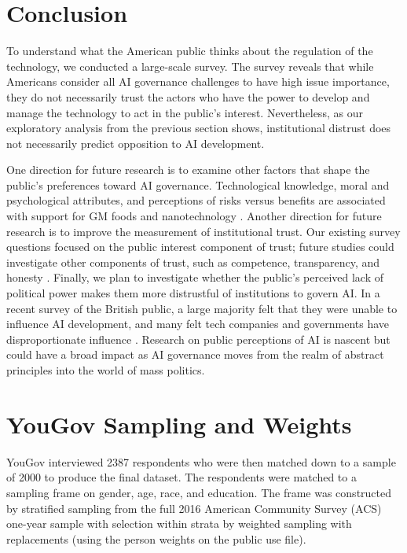 \documentclass{article}
\begin{document}
\section{Conclusion}

To understand what the American public thinks about the regulation of the technology, we conducted a large-scale survey. The survey reveals that while Americans consider all AI governance challenges to have high issue importance, they do not necessarily trust the actors who have the power to develop and manage the technology to act in the public's interest. Nevertheless, as our exploratory analysis from the previous section shows, institutional distrust does not necessarily predict opposition to AI development. 

One direction for future research is to examine other factors that shape the public's preferences toward AI governance. Technological knowledge, moral and psychological attributes, and perceptions of risks versus benefits are associated with support for GM foods and nanotechnology \citep{scott2018overview,satterfield2009anticipating}. Another direction for future research is to improve the measurement of institutional trust. Our existing survey questions focused on the public interest component of trust; future studies could investigate other components of trust, such as competence, transparency, and honesty \citep{lang2005does}. Finally, we plan to investigate whether the public's perceived lack of political power makes them more distrustful of institutions to govern AI. In a recent survey of the British public, a large majority felt that they were unable to influence AI development, and many felt tech companies and governments have disproportionate influence \citep{cave2019scary}. Research on public perceptions of AI is nascent but could have a broad impact as AI governance moves from the realm of abstract principles into the world of mass politics.

%




\newpage


\appendix


\section{YouGov Sampling and Weights}

YouGov interviewed 2387 respondents who were then matched down to a sample of 2000 to produce the final dataset. The respondents were matched to a sampling frame on gender, age, race, and education. The frame was constructed by stratified sampling from the full 2016 American Community Survey (ACS) one-year sample with selection within strata by weighted sampling with replacements (using the person weights on the public use file).
\end{document}

